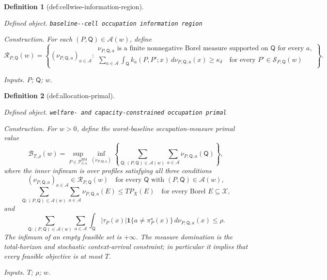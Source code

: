 \documentclass{article}
\newtheorem{definition}{Definition}
\begin{document}
\begin{definition}[def:cellwise-information-region]\label{def:cellwise-information-region}
\par\smallskip\noindent\emph{Defined object.} \texttt{baseline-\allowbreak{}-\allowbreak{}cell occupation information region}
\par\smallskip\noindent\emph{Construction.} For each \((P,\mathsf Q)\in\mathscr A(w)\), define
\[
\mathcal R_{P,\mathsf Q}(w)=\left\{
(\nu_{P,\mathsf Q,a})_{a\in\mathcal A}:
\begin{array}{l}
\nu_{P,\mathsf Q,a}\text{ is a finite nonnegative Borel measure supported on }\mathsf Q\text{ for every }a,\\[2pt]
\displaystyle
\sum_{a\in\mathcal A}\int_{\mathsf Q}
k_a(P,P';x)\,d\nu_{P,\mathsf Q,a}(x)\ge\kappa_\delta
\quad\text{for every }P'\in\mathcal S_{P,\mathsf Q}(w)
\end{array}
\right\}.
\]
\par\smallskip\noindent\emph{Inputs.} \(P\); \(\mathsf Q\); \(w\).
\end{definition}

\begin{definition}[def:allocation-primal]\label{def:allocation-primal}
\par\smallskip\noindent\emph{Defined object.} \texttt{welfare-\allowbreak{} and capacity-\allowbreak{}constrained occupation primal}
\par\smallskip\noindent\emph{Construction.} For \(w>0\), define the worst-baseline occupation-measure primal value
\[
\mathcal B_{T,\rho}(w)
=\sup_{P\in\mathcal P_{\beta,\alpha}^{\mathrm{HM}}}
\inf_{(\nu_{P,\mathsf Q,a})}
\left\{
\sum_{\mathsf Q:(P,\mathsf Q)\in\mathscr A(w)}
\sum_{a\in\mathcal A}\nu_{P,\mathsf Q,a}(\mathsf Q)
\right\},
\]
where the inner infimum is over profiles satisfying all three conditions
\[
(\nu_{P,\mathsf Q,a})_{a\in\mathcal A}\in\mathcal R_{P,\mathsf Q}(w)
\quad\text{for every }\mathsf Q\text{ with }(P,\mathsf Q)\in\mathscr A(w),
\]
\[
\sum_{\mathsf Q:(P,\mathsf Q)\in\mathscr A(w)}
\sum_{a\in\mathcal A}\nu_{P,\mathsf Q,a}(E)
\le T P_X(E)
\quad\text{for every Borel }E\subseteq\mathcal X,
\]
and
\[
\sum_{\mathsf Q:(P,\mathsf Q)\in\mathscr A(w)}
\sum_{a\in\mathcal A}
\int_{\mathsf Q}|\tau_P(x)|\mathbf 1\{a\ne\pi_P^\star(x)\}
\,d\nu_{P,\mathsf Q,a}(x)
\le\rho.
\]
The infimum of an empty feasible set is \(+\infty\).  The measure domination is the total-horizon and stochastic context-arrival constraint; in particular it implies that every feasible objective is at most \(T\).
\par\smallskip\noindent\emph{Inputs.} \(T\); \(\rho\); \(w\).
\end{definition}
\end{document}
